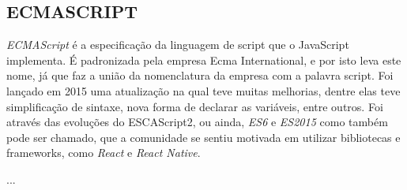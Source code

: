 \subsection{ECMASCRIPT}

\textit{ECMAScript} é a especificação da linguagem de script que o JavaScript implementa. É padronizada pela empresa Ecma International, e por isto leva este nome, já que faz a união da nomenclatura da empresa com a palavra script. Foi lançado em 2015 uma atualização na qual teve muitas melhorias, dentre elas teve simplificação de sintaxe, nova forma de declarar as variáveis, entre outros. \cite{ecma}
Foi através das evoluções do ESCAScript2, ou ainda, \textit{ES6} e \textit{ES2015} como também pode ser chamado, que a comunidade se sentiu motivada em utilizar bibliotecas e frameworks, como \textit{React} e \textit{React Native}. 

...




